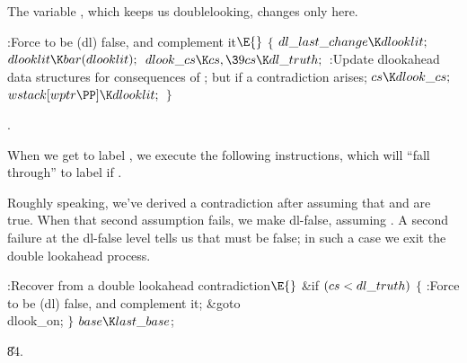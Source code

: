 The variable , which keeps us doublelooking,
changes only here.

\Y\B\4:Force  to be (dl) false, and complement it\X${}%
\E{}$\6
${}\{{}$\1\6
${}\\{dl\_last\_change}\K\\{dlooklit};{}$\6
${}\\{dlooklit}\K\\{bar}(\\{dlooklit});{}$\6
${}\\{dlook\_cs}\K\\{cs},\39\\{cs}\K\\{dl\_truth};{}$\6
:Update dlookahead data structures for consequences of ;
but  if a contradiction arises\X;\6
${}\\{cs}\K\\{dlook\_cs};{}$\6
${}\\{wstack}[\\{wptr}\PP]\K\\{dlooklit};{}$\6
\4${}\}{}$\2\par
{}.\fi

When we get to label , we execute the following
instructions, which will ``fall through'' to label  if
.

Roughly speaking, we've derived a contradiction after assuming
that  and  are true. When that second
assumption fails, we
make  dl-false, assuming .
A second failure at the dl-false level
tells us that  must be false; in such a case we exit
the double lookahead process.

\Y\B\4:Recover from a double lookahead contradiction\X${}\E{}$\6
\&{if} ${}(\\{cs}<\\{dl\_truth}){}$\5
${}\{{}$\1\6
:Force  to be (dl) false, and complement it\X;\6
\&{goto} \\{dlook\_on};\6
\4${}\}{}$\2\6
${}\\{base}\K\\{last\_base}{}$;\par
\U84.\fi

